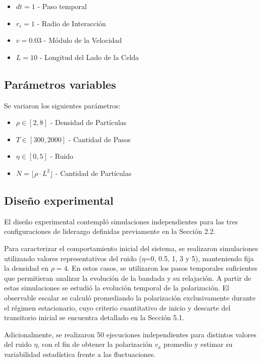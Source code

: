 \documentclass[a4paper,12pt]{article}
\begin{document}
\begin{itemize}
	\item $dt=1$ - Paso temporal
	\item $r_c=1$ - Radio de Interacción
	\item $v=0.03$ - Módulo de la Velocidad
	\item $L=10$ - Longitud del Lado de la Celda
\end{itemize}

\subsection{Parámetros variables}

Se variaron los siguientes parámetros:

\begin{itemize}
	\item $\rho\in[2, 8]$ - Densidad de Partículas
	\item $T\in[300, 2000]$ - Cantidad de Pasos
	\item $\eta\in[0, 5]$ - Ruido
	\item $N = \lfloor \rho \cdot L^2 \rfloor$ - Cantidad de Partículas
\end{itemize}

\subsection{Diseño experimental}

El diseño experimental contempló simulaciones independientes para las tres configuraciones de liderazgo definidas previamente en la Sección 2.2.

Para caracterizar el comportamiento inicial del sistema, se realizaron simulaciones utilizando valores representativos del ruido ($\eta$=0, 0.5, 1, 3 y 5), manteniendo fija la densidad en $\rho=4$. En estos casos, se utilizaron los pasos temporales suficientes que permitieran analizar la evolución de la bandada y su relajación. A partir de estas simulaciones se estudió la evolución temporal de la polarización. El observable escalar se calculó promediando la polarización exclusivamente durante el régimen estacionario, cuyo criterio cuantitativo de inicio y descarte del transitorio inicial se encuentra detallado en la Sección 5.1.

Adicionalmente, se realizaron 50 ejecuciones independientes para distintos valores del ruido $\eta$, con el fin de obtener la polarización $v_a$ promedio y estimar su variabilidad estadística frente a las fluctuaciones.
\end{document}
